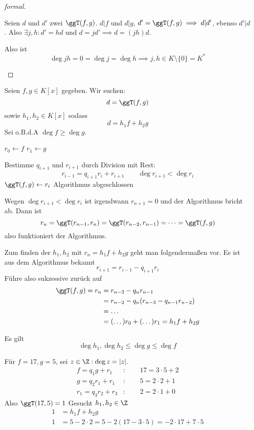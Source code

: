 \documentclass{mycourse}
\begin{document}
\begin{prop}
\begin{proof}[formal]
\begin{seg}[Eindeutigkeit:]
Seien $d$ und $d'$ zwei $\ggT(f,g)$.
$d|f$ und $d|g$, $d'=\ggT(f,g) \implies d|d'$, ebenso $d'|d$.
Also $\exists j,h: d'=hd$ und $d=jd' \implies d=(jh)d$.

Also ist
\[
\deg jh = 0 = \deg j = \deg h \implies j,h\in K\setminus \{0\}=K^*
\]
\end{seg}

\end{proof}


\end{prop}

\begin{alg*} 
Seien $f,g\in K[x]$ gegeben.
Wir suchen:
\[
d=\ggT(f,g)
\]
sowie $h_1,h_2\in K[x]$ sodass
\[
	d=h_1f+h_2g
\]
Sei o.B.d.A $\deg f \ge \deg g$.

\begin{algorithmic}
	\State $r_0 \gets f$
	\State $r_1 \gets g$

		\State Bestimme $q_{i+1}$ und $r_{i+1}$ durch Division mit Rest: 
			\[
				r_{i-1} = q_{i+1}r_i + r_{i+1} \qquad \deg r_{i+1} < \deg r_{i}
			\]
			\State $\ggT(f,g) \gets r_i$
			\State Algorithmus abgeschlossen
		\EndIf
	\EndFor
\end{algorithmic}

Wegen $\deg r_{i+1} < \deg r_{i}$ ist irgendwann $r_{n+1} = 0$ und der Algorithmus bricht ab.
Dann ist
\[
	r_{n} = \ggT(r_{n-1},r_{n}) = \ggT(r_{n-2},r_{n-1}) = \dotsb = \ggT(f,g)
\]
also funktioniert der Algorithmus.

Zum finden der $h_1,h_2$ mit $r_n = h_1f + h_2g$ geht man folgendermaßen vor.
Es ist aus dem Algorithmus bekannt
\[
	r_{i+1} = r_{i-1} - q_{i+1}r_i 
\]
Führe also sukzessive zurück auf
\begin{align*}
	\ggT(f,g) = r_n &= r_{n-2} - q_nr_{n-1} \\
					&= r_{n-2} - q_n(r_{n-3} -q_{n-1}r_{n-2})\\
		&= \dotsc\\
	 &= (\dotso)r_0 + (\dotso)r_1 = h_1f + h_2g
\end{align*}

Es gilt 
\[
	\deg h_1,\deg h_2 \le \deg g \le \deg f
\]

\end{alg*}


\begin{ex}
Für $f=17, g=5$, sei $z\in \Z:\deg z=|z|$.
\begin{align*}
f= q_1g+r_1 &: \qquad 17 = 3\cdot 5 + 2\\
g=q_2r_1 +r_1&: \qquad 5 = 2\cdot 2 + 1\\
r_1=q_3r_2+r_3&: \qquad  2 = 2\cdot 1 + 0
\end{align*}
Also $\ggT(17,5)=1$
Gesucht $h_1,h_2\in \Z$
\begin{align*}
1 &=h_1f+h_2g\\
1 &=5-2\cdot 2=5-2(17-3\cdot 5)=- 2 \cdot 17+7 \cdot 5
\end{align*}


\end{ex}
\end{document}
